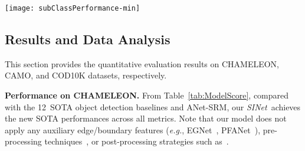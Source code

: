 \documentclass[10pt,journal,compsoc]{IEEEtran}
\def\eg{\emph{e.g.}}
\newcommand{\myPara}[1]{\vspace{6pt}\noindent\textbf{#1}\qquad }
\newcommand{\tabref}[1]{Table~\ref{#1}}
\def\ournewmodel{\emph{SINet}}
\def\baselineN{12}
\begin{document}
\begin{figure*}[t!]
  \centering
  \texttt{[image: subClassPerformance-min]}
  \vspace{-15pt}
  \caption{\textbf{Per-subclass performance.}
    Sub-classes are sorted by \emph{difficulty}, 
    determined by the mean ~\cite{fan2017structure} across 
    \baselineN~baselines. 
    We also provide the minimum (bottom line) and maximum (top line) 
     for each sub-class.
  }\label{fig:subClassPerformance}
\end{figure*}



\subsection{Results and Data Analysis}
This section provides the quantitative evaluation results on CHAMELEON, 
CAMO, and COD10K datasets, respectively.

\myPara{Performance on CHAMELEON.}
From \tabref{tab:ModelScore}, compared with the \baselineN~SOTA object 
detection baselines and ANet-SRM, 
our \ournewmodel~achieves the new SOTA performances across all metrics.
Note that our model does not apply any auxiliary edge/boundary features 
(\eg, EGNet~\cite{zhao2019EGNet}, PFANet~\cite{zhao2019pyramid}), 
pre-processing techniques~\cite{mori2005guiding}, 
or post-processing strategies such as~\cite{kra2011efficient,boykov1999fast}.
\end{document}
